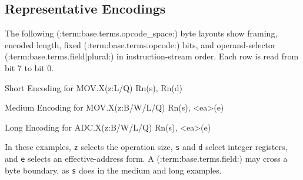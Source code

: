 \subsection{Representative Encodings}

The following (:term:base.terms.opcode_space:) byte layouts show framing, encoded length, fixed (:term:base.terms.opcode:) bits, and
operand-selector (:term:base.terms.field|plural:) in instruction-stream order. Each row is read from bit 7 to bit 0.

\begin{BedrockListedBitDiagram}{Short Encoding for MOV.X(z:L/Q) Rn(s), Rn(d)}
\end{BedrockListedBitDiagram}

\begin{BedrockListedBitDiagram}{Medium Encoding for MOV.X(z:B/W/L/Q) Rn(s), \textless{}ea\textgreater{}(e)}
\end{BedrockListedBitDiagram}

\begin{BedrockListedBitDiagram}{Long Encoding for ADC.X(z:B/W/L/Q) Rn(s), \textless{}ea\textgreater{}(e)}
\end{BedrockListedBitDiagram}

In these examples, \texttt{z} selects the operation size, \texttt{s} and \texttt{d} select integer registers,
and \texttt{e} selects an effective-address form. A (:term:base.terms.field:) may cross a byte boundary, as \texttt{s} does in the
medium and long examples.
